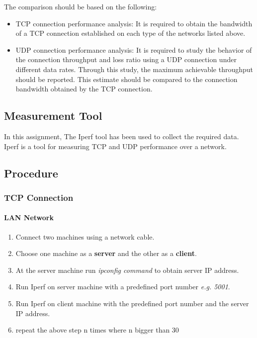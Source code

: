 \documentclass[aps,letterpaper,10pt]{revtex4}
\begin{document}
The comparison should be based on the following:
\begin{itemize}
\item TCP connection performance analysis: It is required to obtain the bandwidth
of a TCP connection established on each type of the networks listed above.
\item UDP connection performance analysis: It is required to study the behavior of
the connection throughput and loss ratio using a UDP connection under different
data rates. Through this study, the maximum achievable throughput should be reported. This estimate should be compared to the connection bandwidth obtained by the TCP connection.
\end{itemize}
\vspace{3mm}  

\subsection{Measurement Tool}
In this assignment, The Iperf tool has been used to collect the required data. Iperf is a tool for measuring TCP and UDP performance over a network.
\subsection{Procedure}
    \subsubsection{TCP Connection}
        \paragraph{LAN Network}    
        	\begin{enumerate}
        		\item Connect two machines using a network cable.
        		\item Choose one machine as a \textbf{server} and the other as a \textbf{client}.
        		\item At the server machine run \textit{ipconfig command} to obtain server IP address.
        		\item Run Iperf on server machine with a predefined port number \textit{e.g. 5001}. 
        		\item Run Iperf on client machine with the predefined port number and the server IP address.
        		\item repeat the above step n times where n bigger than 30
        	\end{enumerate}
\vspace{3mm}  
\end{document}

